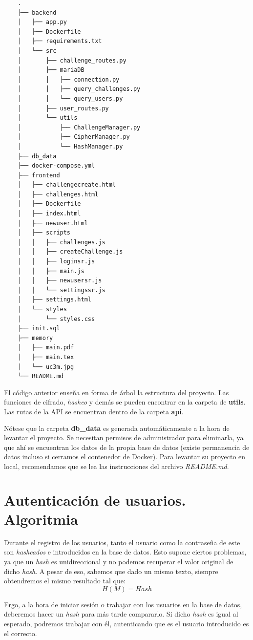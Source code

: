 \documentclass[a4paper,11pt]{article}
\begin{document}
\begin{verbatim}
    .
    ├── backend
    │   ├── app.py
    │   ├── Dockerfile
    │   ├── requirements.txt
    │   └── src
    │       ├── challenge_routes.py
    │       ├── mariaDB
    │       │   ├── connection.py
    │       │   ├── query_challenges.py
    │       │   └── query_users.py
    │       ├── user_routes.py
    │       └── utils
    │           ├── ChallengeManager.py
    │           ├── CipherManager.py
    │           └── HashManager.py
    ├── db_data
    ├── docker-compose.yml
    ├── frontend
    │   ├── challengecreate.html
    │   ├── challenges.html
    │   ├── Dockerfile
    │   ├── index.html
    │   ├── newuser.html
    │   ├── scripts
    │   │   ├── challenges.js
    │   │   ├── createChallenge.js
    │   │   ├── loginsr.js
    │   │   ├── main.js
    │   │   ├── newusersr.js
    │   │   └── settingssr.js
    │   ├── settings.html
    │   └── styles
    │       └── styles.css
    ├── init.sql
    ├── memory
    │   ├── main.pdf
    │   ├── main.tex
    │   └── uc3m.jpg
    └── README.md
\end{verbatim}

El código anterior enseña en forma de árbol la estructura del proyecto. Las funciones de cifrado, \textit{hasheo} y demás se pueden encontrar en la carpeta de \textbf{utils}. Las rutas de la API se encuentran dentro de la carpeta \textbf{api}.

Nótese que la carpeta \textbf{db\_data} es generada automáticamente a la hora de levantar el proyecto. Se necesitan permisos de administrador para eliminarla, ya que ahí se encuentran los datos de la propia base de datos (existe permanencia de datos incluso si cerramos el contenedor de Docker). Para levantar su proyecto en local, recomendamos que se lea las instrucciones del archivo \textit{README.md}.
    
\section{Autenticación de usuarios. Algoritmia}
\label{sec:autenticacionUsuarios}
Durante el registro de los usuarios, tanto el usuario como la contraseña de este son \textit{hasheados} e introducidos en la base de datos. Esto supone ciertos problemas, ya que un \textit{hash} es unidireccional y no podemos recuperar el valor original de dicho \textit{hash}. A pesar de eso, sabemos que dado un mismo texto, siempre obtendremos el mismo resultado tal que:
$$H(M) = Hash$$

Ergo, a la hora de iniciar sesión o trabajar con los usuarios en la base de datos, deberemos hacer un \textit{hash} para más tarde compararlo. Si dicho \textit{hash} es igual al esperado, podremos trabajar con él, autenticando que es el usuario introducido es el correcto.
\end{document}
